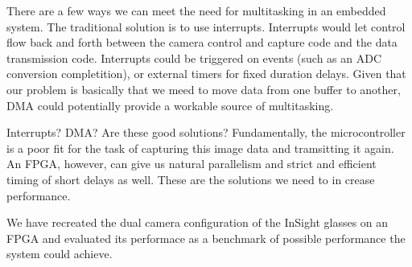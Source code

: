 There are a few ways we can meet the need for multitasking in an embedded system.  The traditional solution is to use interrupts.  Interrupts would let control flow back and forth between the camera control and capture code and the data transmission code.  Interrupts could be triggered on events (such as an ADC conversion completition), or external timers for fixed duration delays.  Given that our problem is basically that we meed to move data from one buffer to another, DMA could potentially provide a workable source of multitasking.

Interrupts?  DMA?  Are these good solutions?  Fundamentally, the microcontroller is a poor fit for the task of capturing this image data and tramsitting it again.  An FPGA, however, can give us natural parallelism and strict and efficient timing of short delays as well.  These are the solutions we need to in crease performance.

We have recreated the dual camera configuration of the InSight glasses on an FPGA and evaluated its performace as a benchmark of possible performance the system could achieve.

